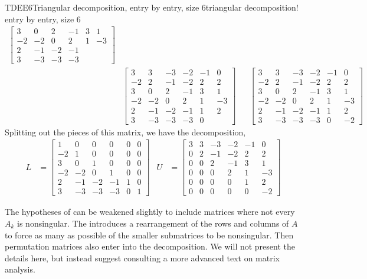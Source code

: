 \begin{example}{TDEE6}{Triangular decomposition, entry by entry, size 6}{triangular decomposition! entry by entry, size 6}
\begin{align*}
\begin{bmatrix}
 3 & 0 & 2 & -1 & 3 & 1 \\
 -2 & -2 & 0 & 2 & 1 & -3 \\
 2 & -1 & -2 & -1  \\
 3 & -3 & -3 & -3 
\end{bmatrix}\\
&
\begin{bmatrix}
 3 & 3 & -3 & -2 & -1 & 0 \\
 -2 & 2 & -1 & -2 & 2 & 2 \\
 3 & 0 & 2 & -1 & 3 & 1 \\
 -2 & -2 & 0 & 2 & 1 & -3 \\
 2 & -1 & -2 & -1 & 1 & 2 \\
 3 & -3 & -3 & -3 & 0 
\end{bmatrix}
&&
\begin{bmatrix}
 3 & 3 & -3 & -2 & -1 & 0 \\
 -2 & 2 & -1 & -2 & 2 & 2 \\
 3 & 0 & 2 & -1 & 3 & 1 \\
 -2 & -2 & 0 & 2 & 1 & -3 \\
 2 & -1 & -2 & -1 & 1 & 2 \\
 3 & -3 & -3 & -3 & 0 & -2
\end{bmatrix}
%
\end{align*}
%
Splitting out the pieces of this matrix, we have the decomposition,
%
\begin{align*}
L&=
\begin{bmatrix}
 1 & 0 & 0 & 0 & 0 & 0 \\
 -2 & 1 & 0 & 0 & 0 & 0 \\
 3 & 0 & 1 & 0 & 0 & 0 \\
 -2 & -2 & 0 & 1 & 0 & 0 \\
 2 & -1 & -2 & -1 & 1 & 0 \\
 3 & -3 & -3 & -3 & 0 & 1
\end{bmatrix}
&
U&=
\begin{bmatrix}
 3 & 3 & -3 & -2 & -1 & 0 \\
 0 & 2 & -1 & -2 & 2 & 2 \\
 0 & 0 & 2 & -1 & 3 & 1 \\
 0 & 0 & 0 & 2 & 1 & -3 \\
 0 & 0 & 0 & 0 & 1 & 2 \\
 0 & 0 & 0 & 0 & 0 & -2
\end{bmatrix}
%
\end{align*}
%
\end{example}
%
The hypotheses of  can be weakened slightly to include matrices where not every $A_k$ is nonsingular.  The introduces a rearrangement of the rows and columns of $A$ to force as many as possible of the smaller submatrices to be nonsingular.  Then permutation matrices also enter into the decomposition.  We will not present the details here, but instead suggest consulting a more advanced text on matrix analysis.
%
  
  

